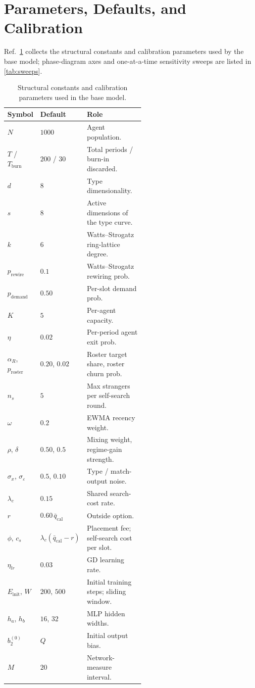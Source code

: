 \documentclass[11pt]{article}
\providecommand{\cref}[1]{\ref{#1}}
\providecommand{\Cref}[1]{Ref.~\ref{#1}}
\newcommand{\Ntot}{N}
\begin{document}
\section{Parameters, Defaults, and Calibration}\label{sec:params}

\Cref{tab:struct} collects the structural constants and calibration parameters used by the base model; phase-diagram axes and one-at-a-time sensitivity sweeps are listed in \cref{tab:sweeps}.

\begin{table}[h]
\centering
\caption{Structural constants and calibration parameters used in the base model.}\label{tab:struct}
\small
\begin{tabular}{@{}llp{0.55\linewidth}@{}}
\toprule
\textbf{Symbol} & \textbf{Default} & \textbf{Role}\\
\midrule
$\Ntot$ & $1000$ & Agent population.\\
$T$ / $T_{\text{burn}}$ & $200$ / $30$ & Total periods / burn-in discarded.\\
$d$ & $8$ & Type dimensionality.\\
$s$ & $8$ & Active dimensions of the type curve.\\
$k$ & $6$ & Watts--Strogatz ring-lattice degree.\\
$p_{\text{rewire}}$ & $0.1$ & Watts--Strogatz rewiring prob.\\
$p_{\text{demand}}$ & $0.50$ & Per-slot demand prob.\\
$K$ & $5$ & Per-agent capacity.\\
$\eta$ & $0.02$ & Per-period agent exit prob.\\
$\alpha_R$, $p_{\text{roster}}$ & $0.20$, $0.02$ & Roster target share, roster churn prob.\\
$n_s$ & $5$ & Max strangers per self-search round.\\
$\omega$ & $0.2$ & EWMA recency weight.\\
$\rho$, $\delta$ & $0.50$, $0.5$ & Mixing weight, regime-gain strength.\\
$\sigma_x$, $\sigma_\varepsilon$ & $0.5$, $0.10$ & Type / match-output noise.\\
$\lambda_c$ & $0.15$ & Shared search-cost rate.\\
$r$ & $0.60\,\bar q_{\text{cal}}$ & Outside option.\\
$\phi$, $c_s$ & $\lambda_c(\bar q_{\text{cal}}-r)$ & Placement fee; self-search cost per slot.\\
$\eta_{lr}$ & $0.03$ & GD learning rate.\\
$E_{\text{init}}$, $W$ & $200$, $500$ & Initial training steps; sliding window.\\
$h_a$, $h_b$ & $16$, $32$ & MLP hidden widths.\\
$b_2^{(0)}$ & $Q$ & Initial output bias.\\
$M$ & $20$ & Network-measure interval.\\
\bottomrule
\end{tabular}
\end{table}
\end{document}
